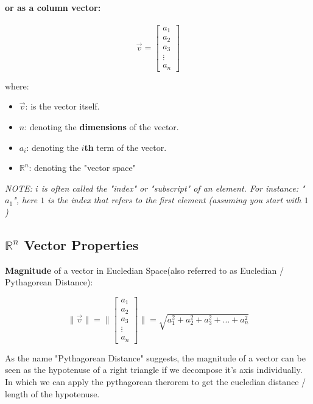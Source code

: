 \paragraph{or as a column vector:}
\begin{center}
    \[
        {\vec{v}} = \begin{bmatrix}a_1 \\ a_2 \\ a_3 \\ \vdots \\ a_n\end{bmatrix}
    \]
\end{center}

where:
\begin{itemize}
    \item $\vec{v}$: is the vector itself.
    \item $n$: denoting the \textbf{dimensions} of the vector.
    \item $a_i$: denoting the \textbf{$i$th} term of the vector.
    \item $\mathbb{R}^n$: denoting the "vector space"
\end{itemize}

\vspace{.5em}

\emph{
    NOTE: $i$ is often called the "index" or "subscript" of an element. For instance:
    "$a_1$", here $1$ is the index that refers to the first element (assuming you start with $1$)
}

\sgap


\subsection{$\mathbb{R}^n$ Vector Properties}

\textbf{Magnitude} of a vector in Eucledian Space(also referred to as Eucledian / Pythagorean Distance):
\begin{center}
    \[
        \|\vec{v}\|=\|\begin{bmatrix}a_1 \\ a_2 \\ a_3 \\ \vdots \\ a_n\end{bmatrix}\|=\sqrt{a_1^2+a_2^2+a_3^2+...+a_n^2}
    \]
\end{center}

As the name "Pythagorean Distance" suggests, the magnitude of a vector can be seen as the hypotenuse of a right triangle if we
decompose it's axis individually. In which we can apply the pythagorean therorem to get the eucledian distance / length of the hypotenuse.

